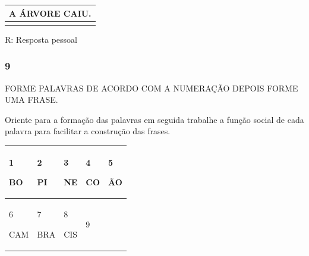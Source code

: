 \begin{longtable}[]{@{}l@{}}
\toprule
A ÁRVORE CAIU.\tabularnewline
\midrule
\endhead
\tabularnewline
\bottomrule
\end{longtable}

R: Resposta pessoal

\subsubsection{9 }\label{section-23}

FORME PALAVRAS DE ACORDO COM A NUMERAÇÃO DEPOIS FORME UMA FRASE.

Oriente para a formação das palavras em seguida trabalhe a função social
de cada palavra para facilitar a construção das frases.

\begin{longtable}[]{@{}lllll@{}}
\toprule
\begin{minipage}[b]{0.19\columnwidth}\raggedright\strut
1

BO\strut
\end{minipage} & \begin{minipage}[b]{0.19\columnwidth}\raggedright\strut
2

PI\strut
\end{minipage} & \begin{minipage}[b]{0.19\columnwidth}\raggedright\strut
3

NE\strut
\end{minipage} & \begin{minipage}[b]{0.19\columnwidth}\raggedright\strut
4

CO\strut
\end{minipage} & \begin{minipage}[b]{0.19\columnwidth}\raggedright\strut
5

ÃO\strut
\end{minipage}\tabularnewline
\midrule
\endhead
\begin{minipage}[t]{0.19\columnwidth}\raggedright\strut
6

CAM\strut
\end{minipage} & \begin{minipage}[t]{0.19\columnwidth}\raggedright\strut
7

BRA\strut
\end{minipage} & \begin{minipage}[t]{0.19\columnwidth}\raggedright\strut
8

CIS\strut
\end{minipage} & \begin{minipage}[t]{0.19\columnwidth}\raggedright\strut
9


\end{minipage}
\end{longtable}
